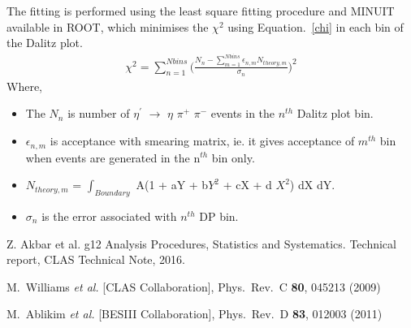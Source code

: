 \documentclass[12pt,a4paper]{amsbook}
\theoremstyle{definition}
\begin{document}
The fitting is performed using the least square fitting procedure and MINUIT available in ROOT, which minimises the $\chi^{2}$ using Equation.~\ref{chi} in each bin of the Dalitz plot.
\begin{eqnarray}
\chi^{2} = \sum_{n=1}^{Nbins} \Bigg( \frac{N_{n} - \sum_{m=1}^{Nbins} \epsilon_{n,m} N_{theory,m}} {\sigma_{n}}   \Bigg)^{2}
\label{chi}
\end{eqnarray}
Where,
\begin {itemize}
\item The $N_{n}$ is number of $\eta^{\prime}$ $\rightarrow$ $\eta$ $\pi^{+}$ $\pi^{-}$ events in the $n^{th}$ Dalitz plot bin.
\item $\epsilon_{n,m}$ is acceptance with smearing matrix, ie.  it gives acceptance of $m^{th}$ bin when events are generated in the n$^{th}$ bin only.
\item $N_{theory,m}$ = $\int_{Boundary}$ A(1 + aY + b$Y^{2}$ + cX + d $X^{2}$) dX dY. 
\item $\sigma_{n}$ is the error associated with $n^{th}$ DP bin.
\end {itemize}






 
\begin{thebibliography}{1}

 Z. Akbar et al. g12 Analysis Procedures, Statistics and Systematics. Technical report, CLAS Technical Note, 2016.

  M.~Williams {\it et al.} [CLAS Collaboration],
  Phys.\ Rev.\ C {\bf 80}, 045213 (2009)


  M.~Ablikim {\it et al.} [BESIII Collaboration],
   Phys.\ Rev.\ D {\bf 83}, 012003 (2011)
\end{thebibliography}
\end{document}
